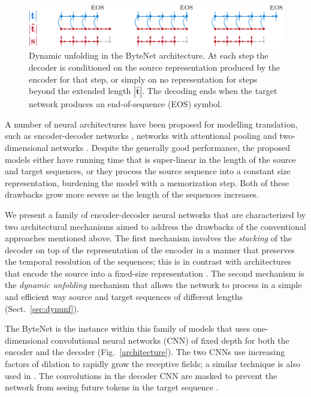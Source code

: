 \documentclass{article}
\newcommand{\figref}[1]{Fig.~\ref{#1}}
\renewcommand{\vec}{\mathbf}
\begin{document}
\begin{figure}
\centering
\includegraphics[width=0.8\linewidth]{dynamic_unfolding.pdf}
\caption{Dynamic unfolding in the ByteNet architecture. At each step the decoder is conditioned on the source representation produced by the encoder for that step, or simply on no representation for steps beyond the extended length $|\hat{\vec{t}}|$. The decoding ends when the target network produces an end-of-sequence (EOS) symbol.}
\label{fig:dynunf}
\end{figure}

A number of neural architectures have been proposed for modelling translation, such as encoder-decoder networks \citep{kalchbrenner13emnlp, DBLP:conf/nips/SutskeverVL14, DBLP:journals/corr/ChoMGBSB14,kaiser2016active}, networks with attentional pooling \citep{DBLP:journals/corr/BahdanauCB14} and two-dimensional networks \citep{DBLP:journals/corr/KalchbrennerDG15}. Despite the generally good performance, the proposed models either have running time that is super-linear in the length of the source and target sequences, or they process the source sequence into a constant size representation, burdening the model with a memorization step. Both of these drawbacks grow more severe as the length of the sequences increases.

We present a family of encoder-decoder neural networks that are characterized by two architectural mechanisms aimed to address the drawbacks of the conventional approaches mentioned above. The first mechanism involves the \emph{stacking} of the decoder on top of the representation of the encoder in a manner that preserves the temporal resolution of the sequences; this is in contrast with architectures that encode the source into a fixed-size representation \citep{kalchbrenner13emnlp, DBLP:conf/nips/SutskeverVL14}.  The second mechanism is the \emph{dynamic unfolding} mechanism that allows the network to process in a simple and efficient way source and target sequences of different lengths (Sect.~\ref{sec:dynunf}).



The ByteNet is the instance within this family of models that uses one-dimensional convolutional neural networks (CNN) of fixed depth for both the encoder and the decoder (\figref{architecture}). The two CNNs use increasing factors of dilation to rapidly grow the receptive fields; a similar technique is also used in \citep{wavenet}. The convolutions in the decoder CNN are masked to prevent the network from seeing future tokens in the target sequence \citep{van2016pixel}.
\end{document}
